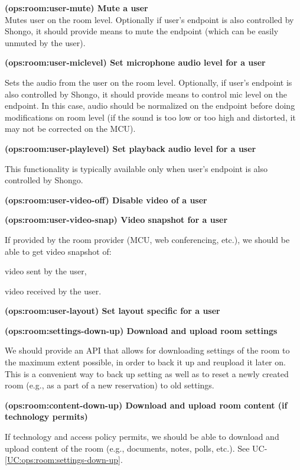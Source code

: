\documentclass[a4paper]{report}
\makeatletter
\newcounter{UCcounter}
\newenvironment{UseCases}%
	{\begin{list}{\textbf{UC-\arabic{UCcounter}}}{\@nmbrlisttrue\def\@listctr{UCcounter}}}%
	{\end{list}}
\newcommand{\UClabel}[1]{\label{UC:#1}}
\newcommand{\UCref}[1]{UC-\ref{UC:#1}}
\newcommand{\UseCase}[2]{\item\UClabel{#2} \textbf{(#2) #1}\\ \nopagebreak}
\makeatother
\begin{document}
\begin{UseCases}
\UseCase{Mute a user}{ops:room:user-mute} Mutes user on the room level.
Optionally if user's endpoint is also controlled by Shongo, it should provide
means to mute the endpoint (which can be easily unmuted by the user).

\UseCase{Set microphone audio level for a user}{ops:room:user-miclevel}

Sets the audio from the user on the room level. Optionally, if user's endpoint
is also controlled by Shongo, it should provide means to control mic level on
the endpoint. In this case, audio should be normalized on the endpoint before
doing modifications on room level (if the sound is too low or too high and
distorted, it may not be corrected on the MCU).

\UseCase{Set playback audio level for a user}{ops:room:user-playlevel}

This functionality is typically available only when user's endpoint is also
controlled by Shongo.

\UseCase{Disable video of a user}{ops:room:user-video-off}

\UseCase{Video snapshot for a user}{ops:room:user-video-snap}

If provided by the room provider (MCU, web conferencing, etc.), we should be
able to get video snapshot of:

\begin{compactitem}

\item video sent by the user,

\item video received by the user.

\end{compactitem}


\UseCase{Set layout specific for a user}{ops:room:user-layout}

\UseCase{Download and upload room settings}{ops:room:settings-down-up}

We should provide an API that allows for downloading settings of the room to
the maximum extent possible, in order to back it up and reupload it later on.
This is a convenient way to back up setting as well as to reset a newly created
room (e.g., as a part of a new reservation) to old settings.

\UseCase{Download and upload room content (if technology
permits)}{ops:room:content-down-up}

If technology and access policy permits, we should be able to download and
upload content of the room (e.g., documents, notes, polls, etc.). See
\UCref{ops:room:settings-down-up}.


\end{UseCases}
\end{document}
